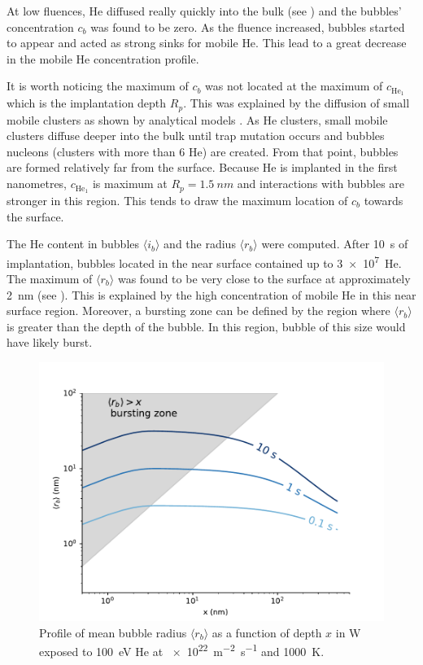 At low \glspl{fluence}, \gls{He} diffused really quickly into the bulk (see ) and the bubbles' concentration $c_b$ was found to be zero.
As the \gls{fluence} increased, bubbles started to appear and acted as strong sinks for mobile \gls{He}.
This lead to a great decrease in the mobile He concentration profile.

It is worth noticing the maximum of $c_b$ was not located at the maximum of $c_{\mathrm{He}_1}$ which is the implantation depth $R_p$.
This was explained by the \gls{diffusion} of small mobile clusters as shown by analytical models .
As \gls{He} clusters, small mobile clusters diffuse deeper into the bulk until \gls{trap mutation} occurs and bubbles nucleons (clusters with more than 6 \gls{He}) are created.
From that point, bubbles are formed relatively far from the surface.
Because \gls{He} is implanted in the first nanometres, $c_{\mathrm{He}_1}$ is maximum at $R_p = \SI{1.5}{nm}$ and interactions with bubbles are stronger in this region.
This tends to draw the maximum location of $c_b$ towards the surface.

The \gls{He} content in bubbles $\langle i_b \rangle$ and the radius $\langle r_b \rangle$ were computed.
After \SI{10}{s} of implantation, bubbles located in the near surface contained up to \SI{3e7}{He}.
The maximum of $\langle r_b \rangle$ was found to be very close to the surface at approximately \SI{2}{nm} (see ).
This is explained by the high concentration of mobile \gls{He} in this near surface region.
Moreover, a bursting zone can be defined by the region where $\langle r_b \rangle$ is greater than the depth of the bubble.
In this region, bubble of this size would have likely burst.

\begin{figure} [h]
    \centering
    \includegraphics[width=\linewidth]{Figures/Chapter4/half_slab/profile_rb.pdf}
    \caption{Profile of mean bubble radius $\langle r_b \rangle$ as a function of depth $x$ in \gls{W} exposed to \SI{100}{eV} \gls{He} at \SI{e22}{m^{-2}.s^{-1}} and \SI{1000}{K}.}
\end{figure}

